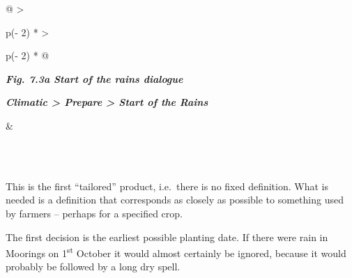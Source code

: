 \documentclass[
  letterpaper,
  DIV=11,
  numbers=noendperiod]{scrreprt}
\begin{document}
\begin{longtable}[]{@{}
  >{\raggedright\arraybackslash}p{(\columnwidth - 2\tabcolsep) * }
  >{\raggedright\arraybackslash}p{(\columnwidth - 2\tabcolsep) * }@{}}
\toprule\noalign{}
\begin{minipage}[b]{\linewidth}\raggedright
\textbf{\emph{Fig. 7.3a Start of the rains dialogue}}

\textbf{\emph{Climatic \textgreater{} Prepare \textgreater{} Start of
the Rains}}
\end{minipage} & \begin{minipage}[b]{\linewidth}\raggedright
\end{minipage} \\
\midrule\noalign{}
\endhead
\bottomrule\noalign{}
\endlastfoot
{} \\
\end{longtable}

This is the first ``tailored'' product, i.e.~there is no fixed
definition. What is needed is a definition that corresponds as closely
as possible to something used by farmers -- perhaps for a specified
crop.

The first decision is the earliest possible planting date. If there were
rain in Moorings on 1\textsuperscript{st} October it would almost
certainly be ignored, because it would probably be followed by a long
dry spell.
\end{document}
